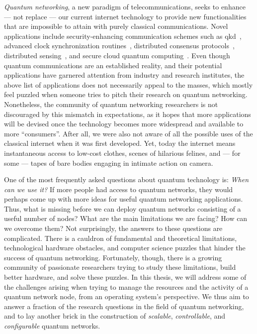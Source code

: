\emph{Quantum networking}, a new paradigm of telecommunications, seeks to enhance --- not replace
--- our current internet technology to provide new functionalities that are impossible to attain
with purely classical communications. Novel applications include security-enhancing communication
schemes such as \acrfull{qkd}~\cite{bennett_2014_bb84, ekert_1991_e91}, advanced clock
synchronization routines~\cite{komar_2014_clocks}, distributed consensus
protocols~\cite{benor_2005_byzantine}, distributed sensing~\cite{gottesman_2012_telescope}, and
secure cloud quantum computing~\cite{broadbent_2009_ubqc, childs_2005_secure_qc}. Even though
quantum communications are an established reality, and their potential applications have garnered
attention from industry and research institutes, the above list of applications does not necessarily
appeal to the masses, which mostly feel puzzled when someone tries to pitch their research on
quantum networking. Nonetheless, the community of quantum networking researchers is not discouraged
by this mismatch in expectations, as it hopes that more applications will be devised once the
technology becomes more widespread and available to more ``consumers''. After all, we were also not
aware of all the possible uses of the classical internet when it was first developed. Yet, today the
internet means instantaneous access to low-cost clothes, scenes of hilarious felines, and --- for
some --- tapes of bare bodies engaging in intimate action on camera.

One of the most frequently asked questions about quantum technology is: \emph{When can we use it?}
If more people had access to quantum networks, they would perhaps come up with more ideas for useful
quantum networking applications. Thus, what is missing before we can deploy quantum networks
consisting of a useful number of nodes? What are the main limitations we are facing? How can we
overcome them? Not surprisingly, the answers to these questions are complicated. There is a cauldron
of fundamental and theoretical limitations, technological hardware obstacles, and computer science
puzzles that hinder the success of quantum networking. Fortunately, though, there is a growing
community of passionate researchers trying to study these limitations, build better hardware, and
solve these puzzles. In this thesis, we will address some of the challenges arising when trying to
manage the resources and the activity of a quantum network node, from an operating system's
perspective. We thus aim to answer a fraction of the research questions in the field of quantum
networking, and to lay another brick in the construction of \emph{scalable}, \emph{controllable},
and \emph{configurable} quantum networks.

